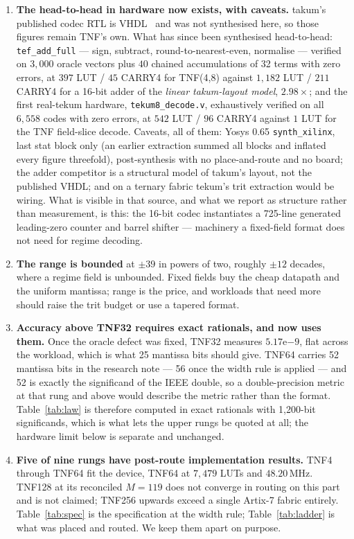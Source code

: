 \begin{enumerate}[leftmargin=*]
\item \textbf{The head-to-head in hardware now exists, with caveats.} takum's
published codec RTL is VHDL~\cite{takumrtl} and was not synthesised here, so
those figures remain TNF's own. What has since been synthesised head-to-head:
\texttt{tef\_add\_full} --- sign, subtract, round-to-nearest-even, normalise
--- verified on $3{,}000$ oracle vectors plus $40$ chained accumulations of 32
terms with zero errors, at $397$ LUT / $45$ CARRY4 for TNF(4,8) against
$1{,}182$ LUT / $211$ CARRY4 for a 16-bit adder of the \emph{linear
takum-layout model}, $2.98\times$; and the first real-tekum hardware,
\texttt{tekum8\_decode.v}, exhaustively verified on all $6{,}558$ codes with
zero errors, at $542$ LUT / $96$ CARRY4 against $1$ LUT for the TNF
field-slice decode. Caveats, all of them: Yosys 0.65 \texttt{synth\_xilinx},
last stat block only (an earlier extraction summed all blocks and inflated
every figure threefold), post-synthesis with no place-and-route and no board;
the adder competitor is a structural model of takum's layout, not the
published VHDL; and on a ternary fabric tekum's trit extraction would be
wiring. What is visible in that source, and what we report as structure
rather than measurement, is this: the 16-bit codec instantiates a 725-line
generated leading-zero counter and barrel shifter --- machinery a fixed-field
format does not need for regime decoding.

\item \textbf{The range is bounded} at $\pm39$ in powers of two, roughly $\pm12$
decades, where a regime field is unbounded. Fixed fields buy the cheap datapath
and the uniform mantissa; range is the price, and workloads that need more should
raise the trit budget or use a tapered format.

\item \textbf{Accuracy above TNF32 requires exact rationals, and now uses them.}
Once the oracle defect was fixed, TNF32 measures $5.17\mathrm{e}{-9}$, flat
across the workload, which is what 25 mantissa bits should give. TNF64 carries
52 mantissa bits in the research note --- 56 once the width rule is applied ---
and 52 is exactly the significand of the IEEE double, so a double-precision
metric at that rung and above would describe the metric rather than the format.
Table~\ref{tab:law} is therefore computed in exact rationals with 1{,}200-bit
significands, which is what lets the upper rungs be quoted at all; the hardware
limit below is separate and unchanged.

\item \textbf{Five of nine rungs have post-route implementation results.} TNF4 through TNF64 fit
the device, TNF64 at $7{,}479$ LUTs and $48.20$\,MHz. TNF128 at its reconciled
$M = 119$ does not
converge in routing on this part and is not claimed; TNF256 upwards exceed a
single Artix-7 fabric entirely. Table~\ref{tab:spec} is the specification at the
width rule; Table~\ref{tab:ladder} is what was placed and routed. We keep them
apart on purpose.


\end{enumerate}
